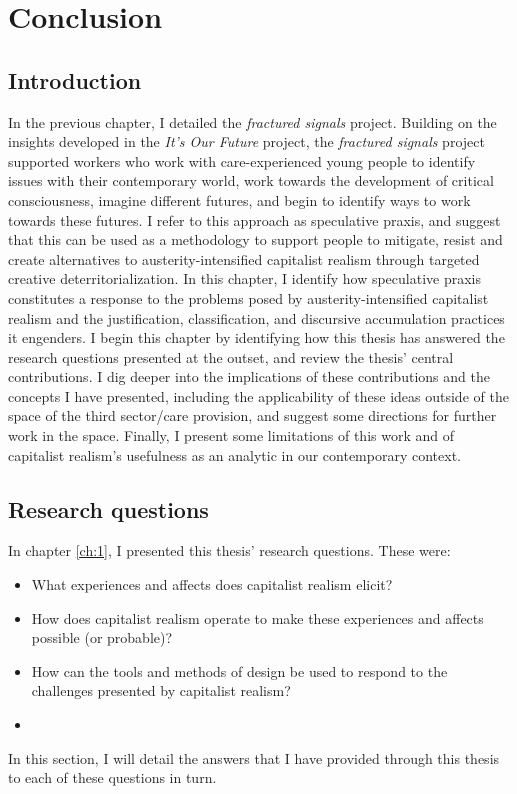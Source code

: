 \chapter{Conclusion}
\label{ch:9}

\section{Introduction}
\label{sec:}
In the previous chapter, I detailed the \textit{fractured signals} project. Building on the insights developed in the \emph{It's Our Future} project, the \emph{fractured signals} project supported workers who work with care-experienced young people to identify issues with their contemporary world, work towards the development of critical consciousness, imagine different futures, and begin to identify ways to work towards these futures. I refer to this approach as speculative praxis, and suggest that this can be used as a methodology to support people to mitigate, resist and create alternatives to austerity-intensified capitalist realism through targeted creative deterritorialization. In this chapter, I identify how speculative praxis constitutes a response to the problems posed by austerity-intensified capitalist realism and the justification, classification, and discursive accumulation practices it engenders. I begin this chapter by identifying how this thesis has answered the research questions presented at the outset, and review the thesis' central contributions. I dig deeper into the implications of these contributions and the concepts I have presented, including the applicability of these ideas outside of the space of the third sector/care provision, and suggest some directions for further work in the space. Finally, I present some limitations of this work and of capitalist realism's usefulness as an analytic in our contemporary context.

\section{Research questions}
In chapter \ref{ch:1}, I presented this thesis' research questions. These were:
\begin{itemize}
    \item What experiences and affects does capitalist realism elicit?
    \item How does capitalist realism operate to make these experiences and affects possible (or probable)?
    \item How can the tools and methods of design be used to respond to the challenges presented by capitalist realism?
    \item \end{itemize}
In this section, I will detail the answers that I have provided through this thesis to each of these questions in turn. 

